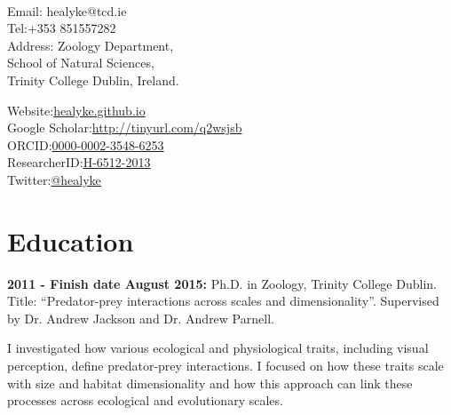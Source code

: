\documentclass[10pt,a4paper]{article}
\begin{document}
\par{\smallskip\par}

\large{}\\

\par{\normalsize{}\bigskip\par}


\begin{minipage}[t]{0.5\textwidth}
\raggedright

Email:  healyke@tcd.ie\\
Tel:\hspace{0mm}+353 851557282\\
Address: Zoology Department,\\
\hspace{0mm}School of Natural Sciences,\\
\hspace{0mm}Trinity College Dublin, Ireland.\\ 


\end{minipage}
\begin{minipage}[t]{0.45\textwidth}

Website:\href{http://healyke.github.io}{healyke.github.io}\\
Google Scholar:\href{http://scholar.google.com/citations?user=5Kb9u8EAAAAJ}{http://tinyurl.com/q2wsjsb}\\
ORCID:\href{http://orcid.org/0000-0002-3548-6253}{0000-0002-3548-6253}\\
ResearcherID:\href{http://www.researcherid.com/rid/H-6512-2013}{H-6512-2013}\\
Twitter:\href{https://twitter.com/healyke}{@healyke}\\
\end{minipage}

\bigskip

\section{Education}

\raggedright	
\textbf{2011 - Finish date August 2015:} Ph.D. in Zoology, Trinity College Dublin. Title: “Predator-prey interactions across scales and dimensionality”. Supervised by Dr. Andrew Jackson and Dr. Andrew Parnell. \smallskip
\par{\fontsize{10.5}{10} I investigated how various ecological and physiological traits, including visual perception, define predator-prey interactions. I focused on how these traits scale with size and habitat dimensionality and how this approach can link these processes across ecological and evolutionary scales.\bigskip}
\end{document}
